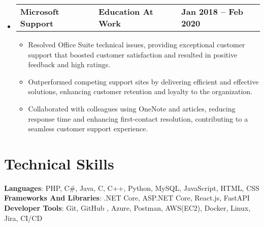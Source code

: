 \documentclass[letterpaper,11pt]{article}
\begin{document}
\begin{itemize}[leftmargin=0.05in, label={}]
	\item{
	            \begin{tabu} {X[l] X[c] X[r]}
		            \textbf{Microsoft Support} & \textbf{Education At Work} & \textbf{Jan 2018 -- Feb 2020} \\
	            \end{tabu}
	            \begin{itemize} [label=$\bullet$]
		            \item{Resolved Office Suite technical issues, providing exceptional customer support that boosted customer satisfaction and resulted in positive feedback and high ratings.}
		            \item{Outperformed competing support sites by delivering efficient and effective solutions, enhancing customer retention and loyalty to the organization.}
		            \item{Collaborated with colleagues using OneNote and articles, reducing response time and enhancing first-contact resolution, contributing to a seamless customer support experience.}
	            \end{itemize}
	      }

\end{itemize}


\section{\textbf{Technical Skills}}
\begin{itemize}[leftmargin=0.05in, label={}]
	{\item{
		            \textbf{Languages}{: PHP, C\#, Java, C, C++, Python, MySQL,  JavaScript, HTML, CSS} \\
		            \textbf{Frameworks And Libraries}{: .NET Core, ASP.NET Core, React.js, FastAPI} \\
		            \textbf{Developer Tools}{: Git, GitHub , Azure, Postman, AWS(EC2), Docker, Linux, Jira, CI/CD} \\
		      }}
\end{itemize}


\end{document}
